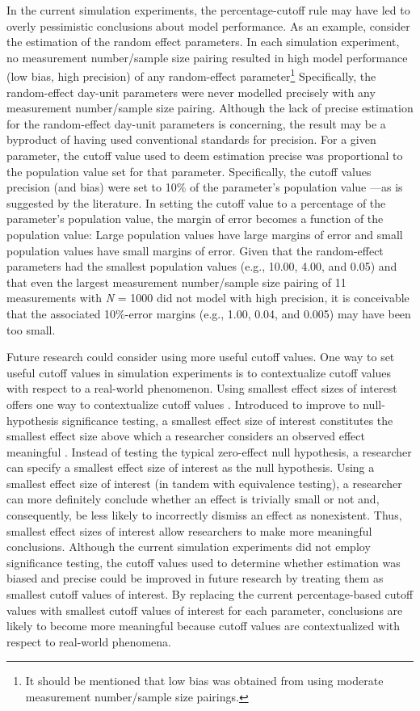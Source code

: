 \documentclass[
12pt, %
twoside,
english]{guelphthesis}
\begin{document}
In the current simulation experiments, the percentage-cutoff rule may have led to overly pessimistic conclusions about model performance. As an example, consider the estimation of the random effect parameters. In each simulation experiment, no measurement number/sample size pairing resulted in high model performance (low bias, high precision) of any random-effect parameter\footnote{It should be mentioned that low bias was obtained from using moderate measurement number/sample size pairings.} Specifically, the random-effect day-unit parameters were never modelled precisely with any measurement number/sample size pairing. Although the lack of precise estimation for the random-effect day-unit parameters is concerning, the result may be a byproduct of having used conventional standards for precision. For a given parameter, the cutoff value used to deem estimation precise was proportional to the population value set for that parameter. Specifically, the cutoff values precision (and bias) were set to 10\% of the parameter's population value \autocite{muthen1997}---as is suggested by the literature. In setting the cutoff value to a percentage of the parameter's population value, the margin of error becomes a function of the population value: Large population values have large margins of error and small population values have small margins of error. Given that the random-effect parameters had the smallest population values (e.g., 10.00, 4.00, and 0.05) and that even the largest measurement number/sample size pairing of 11 measurements with \emph{N} = 1000 did not model with high precision, it is conceivable that the associated 10\%-error margins (e.g., 1.00, 0.04, and 0.005) may have been too small.

Future research could consider using more useful cutoff values. One way to set useful cutoff values in simulation experiments is to contextualize cutoff values with respect to a real-world phenomenon. Using smallest effect sizes of interest offers one way to contextualize cutoff values \autocite{lakens2017,lakens2018}. Introduced to improve to null-hypothesis significance testing, a smallest effect size of interest constitutes the smallest effect size above which a researcher considers an observed effect meaningful \autocite{lakens2017}. Instead of testing the typical zero-effect null hypothesis, a researcher can specify a smallest effect size of interest as the null hypothesis. Using a smallest effect size of interest (in tandem with equivalence testing), a researcher can more definitely conclude whether an effect is trivially small or not and, consequently, be less likely to incorrectly dismiss an effect as nonexistent. Thus, smallest effect sizes of interest allow researchers to make more meaningful conclusions. Although the current simulation experiments did not employ significance testing, the cutoff values used to determine whether estimation was biased and precise could be improved in future research by treating them as smallest cutoff values of interest. By replacing the current percentage-based cutoff values with smallest cutoff values of interest for each parameter, conclusions are likely to become more meaningful because cutoff values are contextualized with respect to real-world phenomena.
\end{document}
